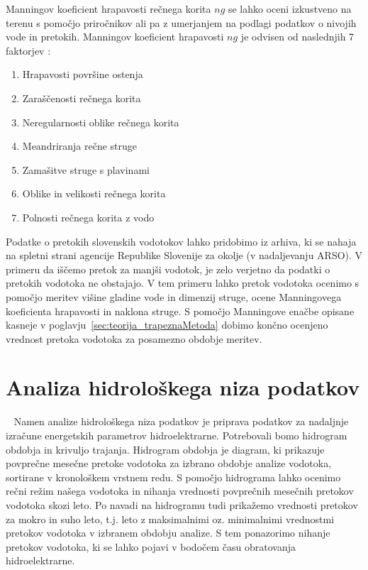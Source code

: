   Manningov koeficient hrapavosti rečnega korita $ng$ se lahko oceni izkustveno na terenu s pomočjo priročnikov ali pa z umerjanjem na podlagi podatkov o nivojih vode in pretokih. Manningov koeficient hrapavosti $ng$ je odvisen od naslednjih 7 faktorjev \cite{VenTeChow}:
 \begin{enumerate}[noitemsep, topsep=0pt]
 	\item Hrapavosti površine ostenja
 	\item Zaraščenosti rečnega korita
 	\item Neregularnosti oblike rečnega korita
 	\item Meandriranja rečne struge
 	\item Zamašitve struge s plavinami 
 	\item Oblike in velikosti rečnega korita
 	\item Polnosti rečnega korita z vodo
 \end{enumerate}
 

 
 
  Podatke o pretokih slovenskih vodotokov lahko pridobimo iz arhiva, ki se nahaja na spletni strani agencije Republike Slovenije za okolje (v nadaljevanju ARSO). V primeru da iščemo pretok za manjši vodotok, je zelo verjetno da podatki o pretokih vodotoka ne obstajajo. V tem primeru lahko pretok vodotoka ocenimo s pomočjo meritev višine gladine vode in dimenzij struge, ocene Manningovega koeficienta hrapavosti in naklona struge. S pomočjo Manningove enačbe opisane kasneje v poglavju~\ref{sec:teorija_trapeznaMetoda} dobimo končno ocenjeno vrednost pretoka vodotoka za posamezno obdobje meritev.




\section{Analiza hidrološkega niza podatkov}~\label{sec:teorija_hidrogramObdobja}
Namen analize hidrološkega niza podatkov je priprava podatkov za nadaljnje izračune energetskih parametrov hidroelektrarne. Potrebovali bomo hidrogram obdobja in krivuljo trajanja. Hidrogram obdobja je diagram, ki prikazuje povprečne mesečne pretoke vodotoka za izbrano obdobje analize vodotoka, sortirane v kronološkem vrstnem redu. S pomočjo hidrograma lahko ocenimo rečni režim našega vodotoka in nihanja vrednosti povprečnih mesečnih pretokov vodotoka skozi leto. Po navadi na hidrogramu tudi prikažemo vrednosti pretokov za mokro in suho leto, t.j. leto z maksimalnimi oz. minimalnimi vrednostmi pretokov vodotoka v izbranem obdobju analize. S tem ponazorimo nihanje pretokov vodotoka, ki se lahko pojavi v bodočem času obratovanja hidroelektrarne.


